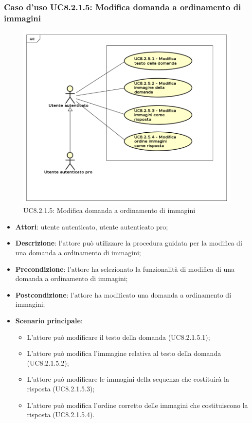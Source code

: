 \subsubsection{Caso d'uso UC8.2.1.5: Modifica domanda a ordinamento di immagini}
\label{UC8.2.1.5}
	\begin{figure}[h]
		\centering
			\includegraphics[scale=0.45,keepaspectratio]{UML/UC8_2_1_5.png}
		\caption{UC8.2.1.5: Modifica domanda a ordinamento di immagini}
	\end{figure}
\begin{itemize}
	\item\textbf{Attori}: utente autenticato, utente autenticato pro;
	\item\textbf{Descrizione}: l'attore può utilizzare la procedura guidata per la modifica di una domanda a ordinamento di immagini;
	\item\textbf{Precondizione}: l'attore ha selezionato la funzionalità di modifica di una domanda a ordinamento di immagini;
	\item \textbf{Postcondizione}: l'attore ha modificato una domanda a ordinamento di immagini;
	\item\textbf{Scenario principale}: 
	\begin{itemize}
		\item L'attore può modificare il testo della domanda (UC8.2.1.5.1);
		\item L'attore può modifica l'immagine relativa al testo della domanda (UC8.2.1.5.2);
		\item L'attore può modificare le immagini della sequenza che costituirà la risposta (UC8.2.1.5.3);
		\item L'attore può modifica l'ordine corretto delle immagini che costituiscono la risposta (UC8.2.1.5.4).
	\end{itemize}
\end{itemize}

